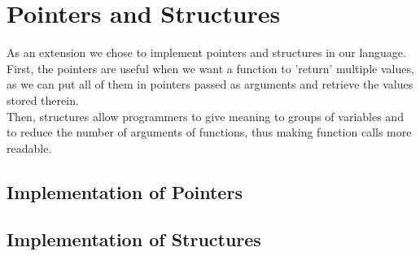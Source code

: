 \documentclass{article}
\begin{document}
\section{Pointers and Structures}
As an extension we chose to implement pointers and structures in our language. First, the pointers are useful
when we want a function to 'return' multiple values, as we can put all of them in pointers passed as arguments and retrieve the values stored therein.\\
Then, structures allow programmers to give meaning to groups of variables and to reduce the number of arguments of functions, thus making function calls more readable. 

\subsection{Implementation of Pointers}
\subsection{Implementation of Structures}
\end{document}
